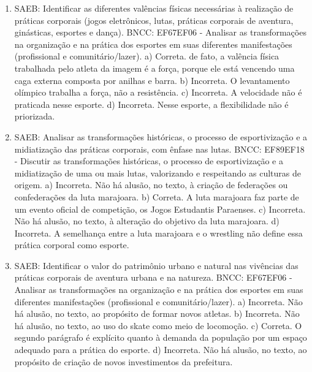\begin{enumerate}
\item
SAEB: Identificar as diferentes valências físicas necessárias à
realização de práticas corporais (jogos eletrônicos, lutas, práticas
corporais de aventura, ginásticas, esportes e dança).
BNCC: EF67EF06 - Analisar as transformações na organização e na prática
dos esportes em suas diferentes manifestações (profissional e
comunitário/lazer).
a) Correta. de fato, a valência física trabalhada pelo atleta da imagem 
é a força, porque ele está vencendo uma caga externa composta por anilhas
e barra.
b) Incorreta. O levantamento olímpico trabalha a força, não a
resistência.
c) Incorreta. A velocidade não é praticada nesse esporte.
d) Incorreta. Nesse esporte, a flexibilidade não é priorizada.

\item
SAEB: Analisar as transformações históricas, o processo de
esportivização e a midiatização das práticas corporais, com ênfase nas
lutas.
BNCC: EF89EF18 - Discutir as transformações históricas, o processo de
esportivização e a midiatização de uma ou mais lutas, valorizando e
respeitando as culturas de origem.
a) Incorreta. Não há alusão, no texto, à criação de
federações ou confederações da luta marajoara. 
b) Correta. A luta marajoara faz parte de um evento oficial de
competição, os Jogos Estudantis Paraenses.
c) Incorreta. Não há alusão, no texto, à alteração do objetivo da luta
marajoara. 
d) Incorreta. A semelhança entre a luta marajoara e o
wrestling não define essa prática corporal como esporte.

\item
SAEB: Identificar o valor do patrimônio urbano e natural
nas vivências das práticas corporais de aventura urbana e na natureza.
BNCC: EF67EF06 - Analisar as transformações na organização e na prática
dos esportes em suas diferentes manifestações (profissional e
comunitário/lazer).
a) Incorreta. Não há alusão, no texto, ao propósito de formar novos
atletas.
b) Incorreta. Não há alusão, no texto, ao uso do skate como meio
de locomoção. 
c) Correta. O segundo parágrafo é explícito quanto à demanda da 
população por um espaço adequado para a prática do esporte.
d) Incorreta. Não há alusão, no texto, ao propósito de criação de novos investimentos da prefeitura.
\end{enumerate}


